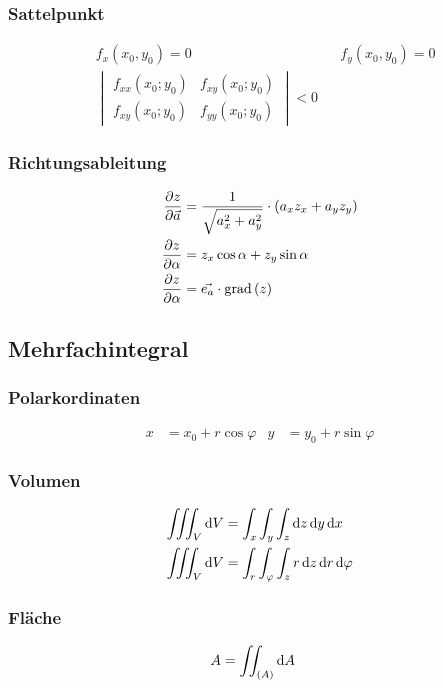 \subsubsection{Sattelpunkt}
\begin{align*}
&f_x(x_0,y_0)=0&&f_y(x_0,y_0)=0\\
&\begin{vmatrix}f_{xx}(x_0;y_0)&f_{xy}(x_0;y_0)\\f_{xy}(x_0;y_0)&f_{yy}(x_0;y_0)\end{vmatrix}<0
\end{align*}

\subsubsection{Richtungsableitung}
\begin{align*}
\frac{\partial z}{\partial \vec{a}}&=\frac{1}{\sqrt{a_x^2+a_y^2}}\cdot\left(a_xz_x+a_yz_y\right)\\
\frac{\partial z}{\partial \alpha}&=z_x\cos\alpha+z_y\sin\alpha\\
\frac{\partial z}{\partial \alpha}&=\vec{e_a}\cdot \mathop{}\!\mathrm{grad}\left(z\right)
\end{align*}

\subsection{Mehrfachintegral}
\subsubsection{Polarkordinaten}
\begin{align*}
x&=x_0+r\cos\varphi&y&=y_0+r\sin\varphi
\end{align*}

\begin{multicols}{2}
\subsubsection{Volumen}
\begin{align*}
\iiint_{V}\diff V&=\int_x\int_y\int_z \diff z\diff y\diff x\\
\iiint_{V}\diff V&=\int_r\int_\varphi\int_z r\diff z\diff r \diff \varphi\\
\end{align*}

\subsubsection{Fläche}
\begin{align*}
A&=\iint_{(A)}\mathop{}\!\mathrm{d} A
\end{align*} 
\vfill
\end{multicols}

